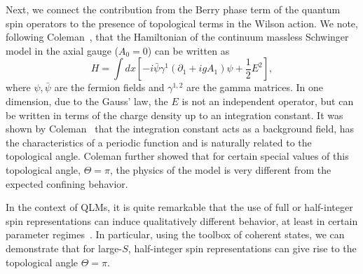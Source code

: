 \documentclass[aps,prl,reprint,twocolumn,superscriptaddress,floatfix,nofootinbib]{revtex4-1}
\begin{document}
Next, we connect the contribution from the Berry phase term of the quantum spin operators to the presence of topological terms in the Wilson action. We note, following Coleman~\cite{Coleman:1976uz}, that the Hamiltonian of the continuum massless Schwinger model in the axial gauge ($A_0=0$) can be written as 
\begin{equation}
	H = \int dx \left[ -i \bar{\psi} \gamma^1 (\partial_1 + i g A_1) \psi + \frac{1}{2} E^2 \right],
\end{equation}
where $\psi, \bar{\psi}$ are the fermion fields and $\gamma^{1,2}$ are the gamma matrices. In one dimension, due to the Gauss' law, the  $E$ is not an independent operator, but can be written in terms of the charge density up to an integration constant. It was shown by Coleman~\cite{Coleman:1976uz} that the integration constant acts as a background field, has the characteristics of a periodic function and is naturally related to the topological angle. Coleman further showed that for certain special values of this topological angle, $\Theta = \pi$, the physics of the model is very different from the expected confining behavior. 

In the context of QLMs, it is quite remarkable that the use of full or half-integer spin representations can induce qualitatively different behavior, at least in certain parameter regimes~\cite{Banerjee2012pg}. In particular, using the toolbox of coherent states, we can demonstrate that for large-$S$, half-integer spin representations can give rise to the topological angle $\Theta = \pi$. 
\end{document}
